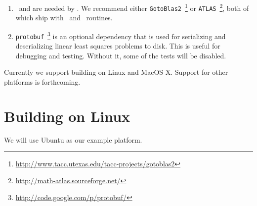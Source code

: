\begin{enumerate}
\item{\blas\ and \lapack} are needed by
  \suitesparse.  We
  recommend either
  \texttt{GotoBlas2}~\footnote{\url{http://www.tacc.utexas.edu/tacc-projects/gotoblas2}}
  or
  \texttt{ATLAS}~\footnote{\url{http://math-atlas.sourceforge.net/}},
    both of which ship with \blas\ and \lapack\ routines.

\item{\texttt{protobuf}~\footnote{\url{http://code.google.com/p/protobuf/}}} is an optional dependency that is used for serializing and deserializing linear least squares problems to disk. This is useful for debugging and testing. Without it, some of the tests will be disabled.
\end{enumerate}

Currently we support building on Linux and MacOS X. Support for other
platforms is forthcoming.

\section{Building on Linux}
We will use Ubuntu as our example platform.

